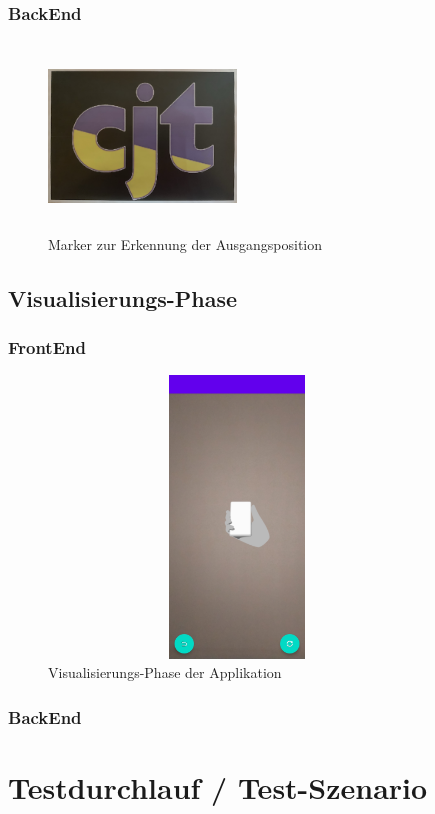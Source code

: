 \subsubsection{BackEnd}
\begin{figure}[hbt!]
    \centering
    \includegraphics[width=5cm,height=5cm,keepaspectratio]{4Umsetzung/Bilder/cjt_logo_tracking.png}
    \caption{Marker zur Erkennung der Ausgangsposition}
    \label{pic:initialMarker}
\end{figure}

\subsection{Visualisierungs-Phase} 
\subsubsection{FrontEnd}
\begin{figure}[hbt!]
    \centering
    \includegraphics[width=10cm,height=7.5cm,keepaspectratio]{4Umsetzung/Bilder/visual-phase.jpg}
    \caption{Visualisierungs-Phase der Applikation}
    \label{pic:visual}
\end{figure}
\subsubsection{BackEnd}

\section{Testdurchlauf / Test-Szenario}
\label{chap:testdurchlauf}